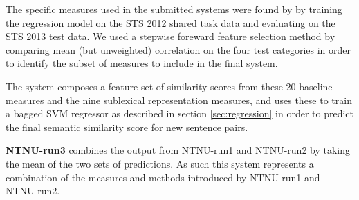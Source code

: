 
The specific measures used in the submitted systems were found by by training the regression model on the STS 2012 shared task data and evaluating on the STS 2013 test data. We used a stepwise foreward feature selection method by comparing mean (but unweighted) correlation on the four test categories in order to identify the subset of measures to include in the final system.

The system composes a feature set of similarity scores from these 20 baseline measures and the nine sublexical representation measures, and uses these to train a bagged SVM regressor as described in section \ref{sec:regression} in order to predict the final semantic similarity score for new sentence pairs.

{\bf NTNU-run3} combines the output from NTNU-run1 and NTNU-run2 by taking the mean of the two sets of predictions. As such this system represents a combination of the measures and methods introduced by NTNU-run1 and NTNU-run2.


